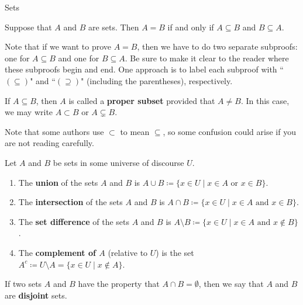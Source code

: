 \begin{section}{Sets}
\begin{theorem}
Suppose that $A$ and $B$ are sets. Then $A=B$ if and only if $A \subseteq B$ and $B \subseteq A$.
\end{theorem}

Note that if we want to prove $A=B$, then we have to do two separate subproofs: one for $A\subseteq B$ and one for $B\subseteq A$. Be sure to make it clear to the reader where these subproofs begin and end. One approach is to label each subproof with ``$(\subseteq)$" and ``$(\supseteq)$" (including the parentheses), respectively.

\begin{definition}
If $A\subseteq B$, then $A$ is called a \textbf{proper subset} provided that $A\neq B$.  In this case, we may write $\boxed{A\subset B}$ or $\boxed{A\subsetneq B}$.
\end{definition}

Note that some authors use $\subset$ to mean $\subseteq$, so some confusion could arise if you are not reading carefully.

\begin{definition}
Let $A$ and $B$ be sets in some universe of discourse $U$.
\begin{enumerate}[label=\textrm{(\alph*)}]
\item The \textbf{union} of the sets $A$ and $B$ is $\boxed{A \cup B \coloneqq \{x\in U \mid x\in A \mbox{ or } x\in B \}}$.
\item The \textbf{intersection} of the sets $A$ and $B$ is $\boxed{A \cap B \coloneqq\{x\in U \mid x\in A \mbox{ and } x\in B \}}$.
\item The \textbf{set difference} of the sets $A$ and $B$ is $\boxed{A \setminus B \coloneqq\{x\in U \mid x\in A \mbox{ and } x\notin B \}}$.
\item The \textbf{complement of $A$} (relative to $U$) is the set $\boxed{A^c\coloneqq U \setminus A =\{x \in U \mid x \notin A\}}$.
\end{enumerate}
\end{definition}

\begin{definition}
If two sets $A$ and $B$ have the property that $A \cap B = \emptyset$, then we say that $A$ and $B$ are \textbf{disjoint} sets.
\end{definition}


\end{section}
